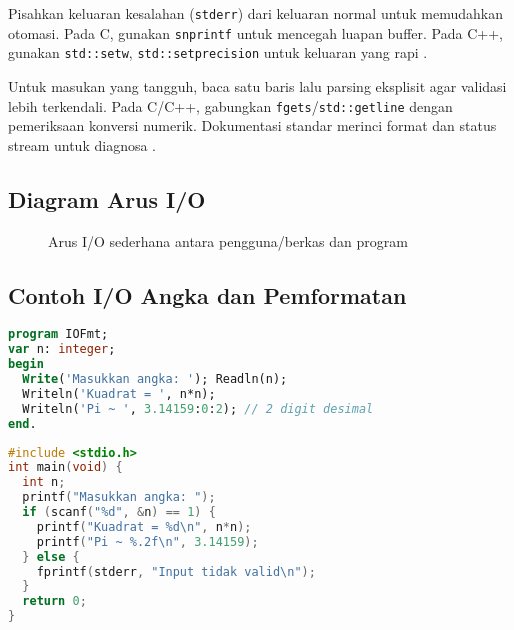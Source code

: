 \documentclass[../main.tex]{subfiles}
\begin{document}
Pisahkan keluaran kesalahan (\texttt{stderr}) dari keluaran normal untuk memudahkan otomasi. Pada C, gunakan \texttt{snprintf} untuk mencegah luapan buffer. Pada C++, gunakan \texttt{std::setw}, \texttt{std::setprecision} untuk keluaran yang rapi \parencite{gnu-c-manual,cpp-reference,cpp-iomanip}.

Untuk masukan yang tangguh, baca satu baris lalu parsing eksplisit agar validasi lebih terkendali. Pada C/C++, gabungkan \texttt{fgets}/\texttt{std::getline} dengan pemeriksaan konversi numerik. Dokumentasi standar merinci format dan status stream untuk diagnosa \parencite{iso-c-draft-n1570,cpp-reference}.

\subsection{Diagram Arus I/O}
\begin{figure}[h]
  \centering
  \caption{Arus I/O sederhana antara pengguna/berkas dan program}
  \label{fig:io-flow}
\end{figure}

\subsection{Contoh I/O Angka dan Pemformatan}
\begin{lstlisting}[language=Pascal, caption={Baca integer dan format keluaran (Pascal)}]
program IOFmt;
var n: integer;
begin
  Write('Masukkan angka: '); Readln(n);
  Writeln('Kuadrat = ', n*n);
  Writeln('Pi ~ ', 3.14159:0:2); // 2 digit desimal
end.
\end{lstlisting}

\begin{lstlisting}[language=C, caption={Baca integer dan format keluaran (C)}]
#include <stdio.h>
int main(void) {
  int n;
  printf("Masukkan angka: ");
  if (scanf("%d", &n) == 1) {
    printf("Kuadrat = %d\n", n*n);
    printf("Pi ~ %.2f\n", 3.14159);
  } else {
    fprintf(stderr, "Input tidak valid\n");
  }
  return 0;
}
\end{lstlisting}
\end{document}
